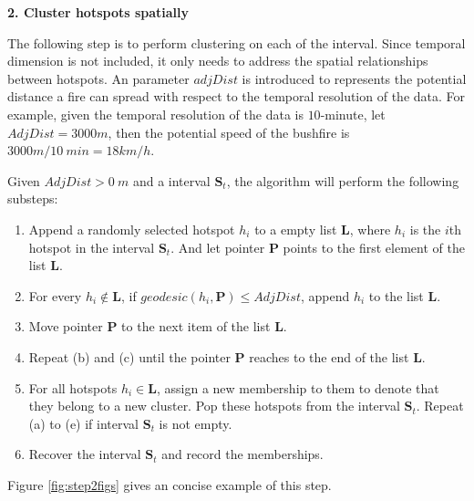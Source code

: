 \textbf{2. Cluster hotspots spatially}

The following step is to perform clustering on each of the interval.
Since temporal dimension is not included, it only needs to address the
spatial relationships between hotspots. An parameter \(adjDist\) is
introduced to represents the potential distance a fire can spread with
respect to the temporal resolution of the data. For example, given the
temporal resolution of the data is \(10\)-minute, let
\(AdjDist = 3000 m\), then the potential speed of the bushfire is
\(3000m/10~min = 18km/h\).

Given \(AdjDist>0~m\) and a interval \(\boldsymbol{S}_t\), the algorithm
will perform the following substeps:

\begin{enumerate}
\def\labelenumi{(\alph{enumi})}
\item
  Append a randomly selected hotspot \(h_i\) to a empty list
  \(\boldsymbol{L}\), where \(h_i\) is the \(i\)th hotspot in the
  interval \(\boldsymbol{S}_t\). And let pointer \(\boldsymbol{P}\)
  points to the first element of the list \(\boldsymbol{L}\).
\item
  For every \(h_i \notin \boldsymbol{L}\), if
  \(geodesic(h_i, \boldsymbol{P})\leq AdjDist\), append \(h_i\) to the
  list \(\boldsymbol{L}\).
\item
  Move pointer \(\boldsymbol{P}\) to the next item of the list
  \(\boldsymbol{L}\).
\item
  Repeat (b) and (c) until the pointer \(\boldsymbol{P}\) reaches to the
  end of the list \(\boldsymbol{L}\).
\item
  For all hotspots \(h_i \in \boldsymbol{L}\), assign a new membership
  to them to denote that they belong to a new cluster. Pop these
  hotspots from the interval \(\boldsymbol{S}_t\). Repeat (a) to (e) if
  interval \(\boldsymbol{S}_t\) is not empty.
\item
  Recover the interval \(\boldsymbol{S}_t\) and record the memberships.
\end{enumerate}

Figure \ref{fig:step2figs} gives an concise example of this step.

